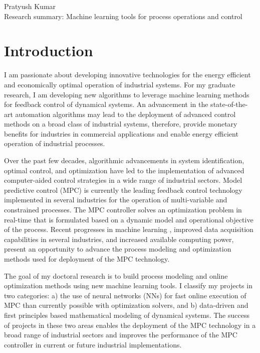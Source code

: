\documentclass[11pt, a4paper]{article} %
\begin{document}
\noindent \large{Pratyush Kumar}
\vspace{0.1in} \\
Research summary: Machine learning tools for process operations and control
\normalsize	

\vspace{0.1in}
\section*{Introduction}

I am passionate about developing innovative technologies for the energy 
efficient and economically optimal operation of industrial systems. For my 
graduate research, I am developing new algorithms to leverage machine learning 
methods for feedback control of dynamical systems. An advancement in 
the state-of-the-art automation algorithms may lead to the deployment of 
advanced control methods on a broad class of industrial systems, 
therefore, provide monetary benefits for industries in commercial applications 
and enable energy efficient operation of industrial processes.

Over the past few decades, algorithmic advancements in system identification, 
optimal control, and optimization have led to the implementation of 
advanced computer-aided control strategies in a wide range of industrial 
sectors. Model predictive control (MPC) is currently the leading feedback 
control technology implemented in several industries for the operation of 
multi-variable and constrained processes. The MPC controller solves an 
optimization problem in real-time that is formulated based on a dynamic model 
and operational objective of the process. Recent progresses in machine 
learning \citep{lecun:bengio:hinton:2015}, improved data acquisition 
capabilities in 
several industries, 
and 
increased available computing power, present an opportunity to advance the 
process modeling and optimization methods used for deployment of the MPC 
technology.

The goal of my doctoral research is to build process modeling and online 
optimization methods using new machine learning tools. I classify 
my projects in two categories: a) the use of neural networks (NNs) for 
fast online execution of MPC than currently possible with optimization solvers, 
and b) data-driven and first principles based mathematical modeling of 
dynamical systems. The success of projects in these two areas enables 
the deployment of the MPC technology in a broad range of industrial sectors and 
improves the performance of the MPC controller in current or future industrial 
implementations.
\end{document}
